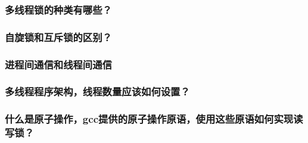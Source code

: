 \documentclass[UTF8,a4paper,8pt]{ctexart}
\begin{document}
		\subsubsection{多线程锁的种类有哪些？}
		
		\subsubsection{自旋锁和互斥锁的区别？}
		
		\subsubsection{进程间通信和线程间通信}
		
		\subsubsection{多线程程序架构，线程数量应该如何设置？}
		
		\subsubsection{什么是原子操作，gcc提供的原子操作原语，使用这些原语如何实现读写锁？}
		
\end{document}
